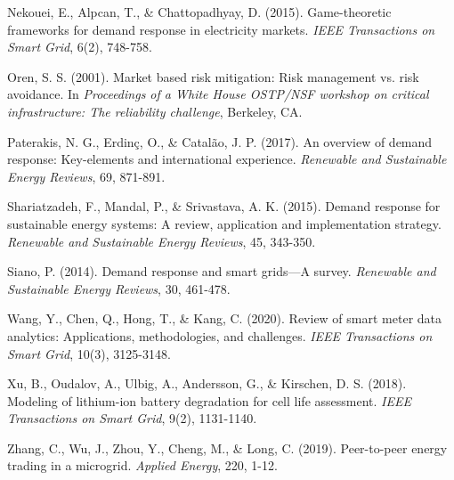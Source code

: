 \documentclass[11pt,a4paper]{article}
\begin{document}
\begin{thebibliography}{45}
Nekouei, E., Alpcan, T., \& Chattopadhyay, D. (2015).
\newblock Game-theoretic frameworks for demand response in electricity markets.
\newblock \emph{IEEE Transactions on Smart Grid}, 6(2), 748-758.

Oren, S. S. (2001).
\newblock Market based risk mitigation: Risk management vs. risk avoidance.
\newblock In \emph{Proceedings of a White House OSTP/NSF workshop on critical infrastructure: The reliability challenge}, Berkeley, CA.

Paterakis, N. G., Erdinç, O., \& Catalão, J. P. (2017).
\newblock An overview of demand response: Key-elements and international experience.
\newblock \emph{Renewable and Sustainable Energy Reviews}, 69, 871-891.

Shariatzadeh, F., Mandal, P., \& Srivastava, A. K. (2015).
\newblock Demand response for sustainable energy systems: A review, application and implementation strategy.
\newblock \emph{Renewable and Sustainable Energy Reviews}, 45, 343-350.

Siano, P. (2014).
\newblock Demand response and smart grids—A survey.
\newblock \emph{Renewable and Sustainable Energy Reviews}, 30, 461-478.

Wang, Y., Chen, Q., Hong, T., \& Kang, C. (2020).
\newblock Review of smart meter data analytics: Applications, methodologies, and challenges.
\newblock \emph{IEEE Transactions on Smart Grid}, 10(3), 3125-3148.

Xu, B., Oudalov, A., Ulbig, A., Andersson, G., \& Kirschen, D. S. (2018).
\newblock Modeling of lithium-ion battery degradation for cell life assessment.
\newblock \emph{IEEE Transactions on Smart Grid}, 9(2), 1131-1140.

Zhang, C., Wu, J., Zhou, Y., Cheng, M., \& Long, C. (2019).
\newblock Peer-to-peer energy trading in a microgrid.
\newblock \emph{Applied Energy}, 220, 1-12.

\end{thebibliography}
\end{document}
